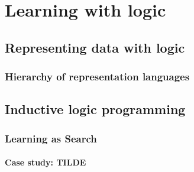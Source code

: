 \chapter{Learning with logic}\label{ch:learninglogic}










\section{Representing data with logic}







\subsection{Hierarchy of representation languages}





\section{Inductive logic programming}





\subsection{Learning as Search}



\subsubsection{Case study: TILDE}

